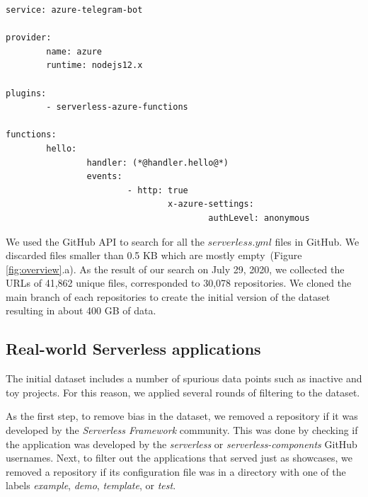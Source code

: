 \begin{minipage}{\linewidth}
\begin{lstlisting}[frame=single, caption=An example of a serverless.yml configuration file., label={lst:example}, captionpos=b]
service: azure-telegram-bot 

provider:  
		name: azure
		runtime: nodejs12.x  

plugins:  
		- serverless-azure-functions 

functions:
		hello:    
				handler: (*@handler.hello@*)
				events:   
						- http: true        
								x-azure-settings:          
										authLevel: anonymous
\end{lstlisting}
\end{minipage}

\vspace{2mm}

We used the GitHub API to search for all the $serverless.yml$ files in GitHub. 
We discarded files smaller than 0.5 KB which are mostly empty~(Figure \ref{fig:overview}.a).
As the result of our search on July 29, 2020, 
we collected the URLs of 41,862 unique files, corresponded to 
30,078 repositories. We cloned the main branch of each repositories to 
create the initial version of the dataset resulting in about 400 GB of data.

\subsection{Real-world Serverless applications} \label{phaseB}
The initial dataset includes a number of spurious data points 
such as inactive and toy projects. For this reason, we applied 
several rounds of filtering to the dataset.

As the first step, to remove bias in the dataset, we removed a 
repository if it was developed by the \emph{Serverless Framework} community. 
This was done by checking if the application was developed by the \emph{serverless} 
or \emph{serverless-components} GitHub usernames.
Next, to filter out the applications 
that served just as showcases, we removed a repository if its configuration file 
was in a directory with one of the labels 
\emph{example}, \emph{demo}, \emph{template}, or \emph{test}.

